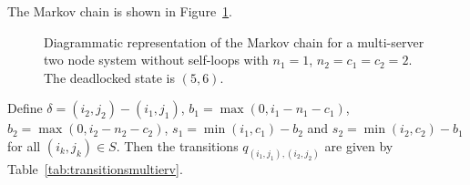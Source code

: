 \documentclass{article}
\numberwithin{equation}{section}
\begin{document}
The Markov chain is shown in Figure~\ref{fig:2nodeMCms}.

\begin{figure}[!htbp]
    
    \caption{Diagrammatic representation of the Markov chain for a
    multi-server two node system without self-loops with $n_1=1$,
    $n_2=c_1=c_2=2$. The deadlocked state is $(5,6)$.}
    \label{fig:2nodeMCms}
\end{figure}

Define $\delta = (i_2, j_2) - (i_1, j_1)$, $b_1 = \max(0, i_1-n_1-c_1)$,
$b_2 = \max(0, i_2-n_2-c_2)$, $s_1 = \min(i_1, c_1)-b_2$ and
$s_2 = \min(i_2, c_2)-b_1$ for all $(i_k, j_k) \in S$.
Then the transitions $q_{(i_1, j_1),(i_2, j_2)}$ are given by
Table~\ref{tab:transitionsmultierv}.
\end{document}
